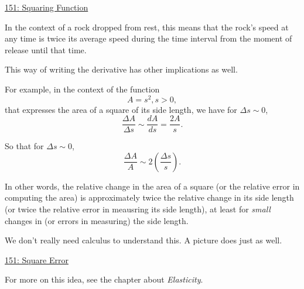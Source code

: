 \documentclass{ximera}
\begin{document}
\begin{onlineOnly}
    \begin{center}
\end{center}
\end{onlineOnly}

\href{https://www.desmos.com/calculator/aamjtxiqgi}{151: Squaring Function}


In the context of a rock dropped from rest, this means that the rock's speed at any time is twice its average speed during the time interval from the moment of release until that time. %

This way of writing the derivative has other implications as well. 

For example, in the context of the function 
\[
    A = s^2 , s>0,
\]
that expresses the area of a square of its side length, we have for $\Delta s\sim 0$,
\[
        \frac{\Delta A}{\Delta s} \sim \frac{dA}{ds} = \frac{2A}{s} .
\]

So that for $\Delta s \sim 0$,
\[
    \frac{\Delta A}{A} \sim 2 \left( \frac{\Delta s}{s}  \right) .
\]

In other words, the relative change  in the area of a square (or the relative error in computing the area) is approximately twice the relative change in its side length  (or twice the relative error in meausring its side length), at least for \emph{small} changes in (or errors in measuring) the side length. 

We don't really need calculus to understand this. A picture does just as well.

\begin{onlineOnly}
    \begin{center}
\end{center}
\end{onlineOnly}

\href{https://www.desmos.com/calculator/h2fm6mm8ua}{151: Square Error}

For more on this idea, see the chapter about \emph{Elasticity}.
\end{document}
